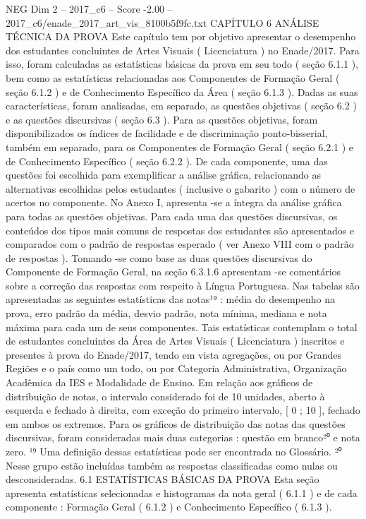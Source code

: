 \begin{textsample}{NEG Dim 2 – 2017\_c6 – Score -2.00 – 2017\_c6/enade\_2017\_art\_vis\_8100b5f9fc.txt}  \label{ex:f2_neg_169}
CAPÍTULO 6 ANÁLISE TÉCNICA DA PROVA Este capítulo tem por objetivo apresentar o desempenho dos estudantes concluintes de Artes Visuais ( Licenciatura ) no Enade/2017.
Para isso, foram calculadas as estatísticas básicas da prova em seu todo ( seção 6.1.1 ), bem como as estatísticas relacionadas aos Componentes de Formação Geral ( seção 6.1.2 ) e de Conhecimento Específico da Área ( seção 6.1.3 ).
Dadas as suas características, foram analisadas, em separado, as questões objetivas ( seção 6.2 ) e as questões discursivas ( seção 6.3 ).
Para as questões objetivas, foram disponibilizados os índices de facilidade e de discriminação ponto-bisserial, também em separado, para os Componentes de Formação Geral ( seção 6.2.1 ) e de Conhecimento Específico ( seção 6.2.2 ).
De cada componente, uma das questões foi escolhida para exemplificar a análise gráfica, relacionando as alternativas escolhidas pelos estudantes ( inclusive o gabarito ) com o número de acertos no componente.
No Anexo I, apresenta -se a íntegra da análise gráfica para todas as questões objetivas.
Para cada uma das questões discursivas, os conteúdos dos tipos mais comuns de respostas dos estudantes são apresentados e comparados com o padrão de respostas esperado ( ver Anexo VIII com o padrão de respostas ).
Tomando -se como base as duas questões discursivas do Componente de Formação Geral, na seção 6.3.1.6 apresentam -se comentários sobre a correção das respostas com respeito à Língua Portuguesa.
Nas tabelas são apresentadas as seguintes estatísticas das notas¹⁹ : média do desempenho na prova, erro padrão da média, desvio padrão, nota mínima, mediana e nota máxima para cada um de seus componentes.
Tais estatísticas contemplam o total de estudantes concluintes da Área de Artes Visuais ( Licenciatura ) inscritos e presentes à prova do Enade/2017, tendo em vista agregações, ou por Grandes Regiões e o país como um todo, ou por Categoria Administrativa, Organização Acadêmica da IES e Modalidade de Ensino.
Em relação aos gráficos de distribuição de notas, o intervalo considerado foi de 10 unidades, aberto à esquerda e fechado à direita, com exceção do primeiro intervalo, [ 0 ; 10 ], fechado em ambos os extremos.
Para os gráficos de distribuição das notas das questões discursivas, foram consideradas mais duas categorias : questão em branco²⁰ e nota zero. ¹⁹ Uma definição dessas estatísticas pode ser encontrada no Glossário. ²⁰ Nesse grupo estão incluídas também as respostas classificadas como nulas ou desconsideradas. 6.1 ESTATÍSTICAS BÁSICAS DA PROVA Esta seção apresenta estatísticas selecionadas e histogramas da nota geral ( 6.1.1 ) e de cada componente : Formação Geral ( 6.1.2 ) e Conhecimento Específico ( 6.1.3 ).

\end{textsample}
